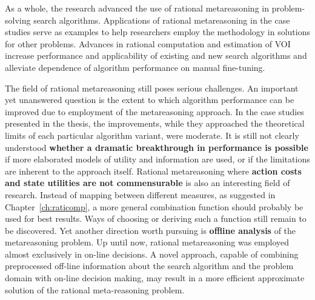 As a whole, the research advanced the use of rational
metareasoning in problem-solving search algorithms. Applications of
rational metareasoning in the case studies serve as examples
to help researchers employ the methodology in solutions for other
problems. Advances in rational computation and estimation of VOI increase
performance and applicability of existing and new search algorithms
and alleviate dependence of algorithm performance on manual
fine-tuning.

The field of rational metareasoning still poses serious
challenges. An important yet unanswered question is the extent
to which algorithm performance can be improved due to employment of
the metareasoning approach. In the case studies presented in the thesis,
the improvements, while they approached the theoretical limits of each
particular algorithm variant, were moderate. It is still not clearly
understood \textbf{whether a dramatic breakthrough in performance is possible}
if more elaborated models of utility and information are used, or if the 
limitations are inherent to the approach itself. Rational
metareasoning where \textbf{action costs and state utilities are not
  commensurable} is also an interesting field of research. Instead of
mapping between different measures, as suggested in
Chapter~\ref{ch:raticomp}, a more general combination function should
probably be used for best results. Ways of choosing or deriving such a
function still remain to be discovered. Yet another direction worth
pursuing is \textbf{offline analysis} of the metareasoning
problem. Up until now, rational metareasoning was employed almost
exclusively in on-line decisions. A novel approach, capable of combining
preprocessed off-line information about the search algorithm and the
problem domain with on-line decision making, may result in a more
efficient approximate solution of the rational meta-reasoning problem.
